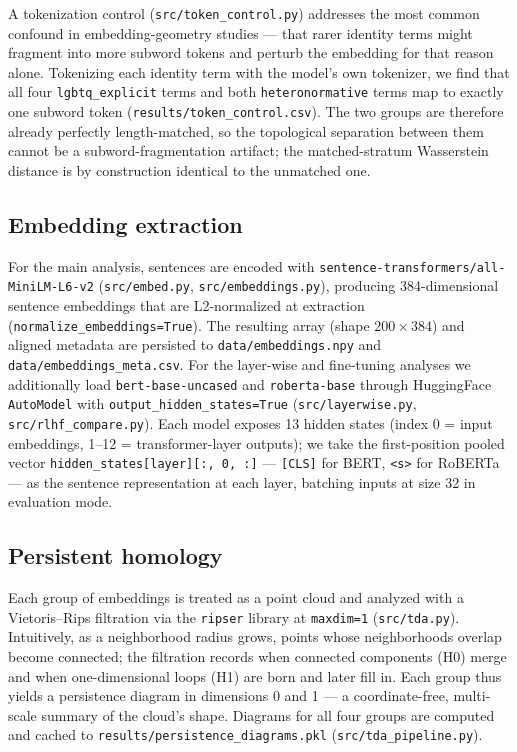 \documentclass[11pt]{article}
\begin{document}
A tokenization control (\texttt{src/token\_control.py}) addresses the most common confound in embedding-geometry studies --- that rarer identity terms might fragment into more subword tokens and perturb the embedding for that reason alone. Tokenizing each identity term with the model's own tokenizer, we find that all four \texttt{lgbtq\_explicit} terms and both \texttt{heteronormative} terms map to exactly one subword token (\texttt{results/token\_control.csv}). The two groups are therefore already perfectly length-matched, so the topological separation between them cannot be a subword-fragmentation artifact; the matched-stratum Wasserstein distance is by construction identical to the unmatched one.

\subsection{Embedding extraction}

For the main analysis, sentences are encoded with \texttt{sentence-transformers/all-MiniLM-L6-v2} (\texttt{src/embed.py}, \texttt{src/embeddings.py}), producing 384-dimensional sentence embeddings that are L2-normalized at extraction (\texttt{normalize\_embeddings=True}). The resulting array (shape $200 \times 384$) and aligned metadata are persisted to \texttt{data/embeddings.npy} and \texttt{data/embeddings\_meta.csv}. For the layer-wise and fine-tuning analyses we additionally load \texttt{bert-base-uncased} and \texttt{roberta-base} through HuggingFace \texttt{AutoModel} with \texttt{output\_hidden\_states=True} (\texttt{src/layerwise.py}, \texttt{src/rlhf\_compare.py}). Each model exposes 13 hidden states (index 0 = input embeddings, 1--12 = transformer-layer outputs); we take the first-position pooled vector \texttt{hidden\_states[layer][:, 0, :]} --- \texttt{[CLS]} for BERT, \texttt{<s>} for RoBERTa --- as the sentence representation at each layer, batching inputs at size 32 in evaluation mode.

\subsection{Persistent homology}

Each group of embeddings is treated as a point cloud and analyzed with a Vietoris--Rips filtration \citep{edelsbrunner2010computational, carlsson2009topology} via the \texttt{ripser} library at \texttt{maxdim=1} (\texttt{src/tda.py}). Intuitively, as a neighborhood radius grows, points whose neighborhoods overlap become connected; the filtration records when connected components (H0) merge and when one-dimensional loops (H1) are born and later fill in. Each group thus yields a persistence diagram in dimensions 0 and 1 --- a coordinate-free, multi-scale summary of the cloud's shape. Diagrams for all four groups are computed and cached to \texttt{results/persistence\_diagrams.pkl} (\texttt{src/tda\_pipeline.py}).
\end{document}
